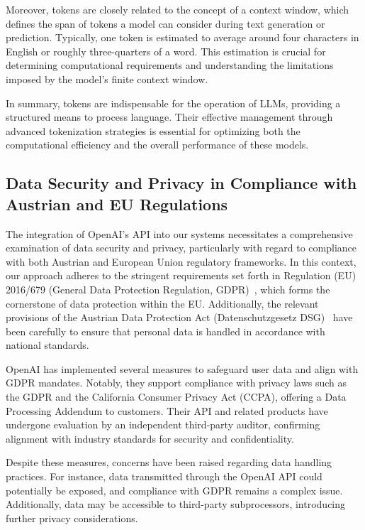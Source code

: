 Moreover, tokens are closely related to the concept of a context window, which defines the span of tokens a model can consider during text generation or prediction. 
Typically, one token is estimated to average around four characters in English or roughly three-quarters of a word. 
This estimation is crucial for determining computational requirements and understanding the limitations imposed by the model’s finite context window.

In summary, tokens are indispensable for the operation of LLMs, providing a structured means to process language. 
Their effective management through advanced tokenization strategies is essential for optimizing both the computational efficiency and the overall performance 
of these models.

\cite{understanding-tokens-context-window-llms}


\subsection{Data Security and Privacy in Compliance with Austrian and EU Regulations}

The integration of OpenAI's API into our systems necessitates a comprehensive examination of data security and privacy, 
particularly with regard to compliance with both Austrian and European Union regulatory frameworks. 
In this context, our approach adheres to the stringent requirements set forth in Regulation (EU) 2016/679
(General Data Protection Regulation, GDPR) \cite{EU2016GDPR}, which forms the cornerstone of data protection within the EU. Additionally,
the relevant provisions of the Austrian Data Protection Act (Datenschutzgesetz DSG) \cite{AustrianDSG} have been carefully 
to ensure that personal data is handled in accordance with national standards.

OpenAI has implemented several measures to safeguard user data and align with GDPR mandates. 
Notably, they support compliance with privacy laws such as the GDPR and the California Consumer Privacy Act (CCPA), 
offering a Data Processing Addendum to customers. Their API and related products have undergone evaluation by an independent third-party auditor, 
confirming alignment with industry standards for security and confidentiality. 

\cite{OpenAI-Data-Residency-Europe}

Despite these measures, concerns have been raised regarding data handling practices. 
For instance, data transmitted through the OpenAI API could potentially be exposed, and compliance with GDPR remains a complex issue. Additionally, 
data may be accessible to third-party subprocessors, introducing further privacy considerations.

